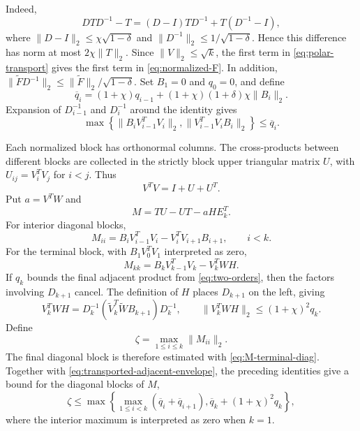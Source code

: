 \documentclass[11pt]{article}
\theoremstyle{definition}
\begin{document}
Indeed,
\[
 DTD^{-1}-T=(D-I)TD^{-1}+T(D^{-1}-I),
\]
where $\|D-I\|_2\le\chi\sqrt{1-\delta}$ and
$\|D^{-1}\|_2\le1/\sqrt{1-\delta}$.  Hence this difference has norm at most
$2\chi\|T\|_2$.  Since $\|V\|_2\le\sqrt{k}$, the first term in
\eqref{eq:polar-transport} gives the first term in
\eqref{eq:normalized-F}.  In addition,
$\|\widetilde FD^{-1}\|_2\le\|\widetilde F\|_2/\sqrt{1-\delta}$.
Set $B_1=0$ and $q_0=0$, and define
\begin{equation}
 \overline q_i=(1+\chi)q_{i-1}
 +(1+\chi)(1+\delta)\chi\|B_i\|_2.
 \label{eq:transported-adjacent-envelope}
\end{equation}
Expansion of $D_{i-1}^{-1}$ and $D_i^{-1}$ around the identity gives
\begin{equation}
 \max\left\{
 \|B_iV_{i-1}^TV_i\|_2,
 \|V_{i-1}^TV_iB_i\|_2
 \right\}\le\overline q_i.
 \label{eq:transported-adjacent-bound}
\end{equation}

Each normalized block has orthonormal columns.  The cross-products between
different blocks are collected in the strictly block upper triangular
matrix $U$, with $U_{ij}=V_i^TV_j$ for $i<j$.  Thus
\begin{equation}
 V^TV=I+U+U^T.
 \label{eq:U-def}
\end{equation}
Put $a=V^TW$ and
\begin{equation}
 M=TU-UT-aHE_k^T.
 \label{eq:M-def}
\end{equation}
For interior diagonal blocks,
\begin{equation}
 M_{ii}=B_iV_{i-1}^TV_i-V_i^TV_{i+1}B_{i+1},
 \qquad i<k.
 \label{eq:M-diag}
\end{equation}
For the terminal block, with $B_1V_0^TV_1$ interpreted as zero,
\begin{equation}
 M_{kk}=B_kV_{k-1}^TV_k-V_k^TWH.
 \label{eq:M-terminal-diag}
\end{equation}
If $q_k$ bounds the final adjacent product from
\eqref{eq:two-orders}, then the factors involving $D_{k+1}$ cancel.  The
definition of $H$ places $D_{k+1}$ on the left, giving
\begin{equation}
 V_k^TWH
 =D_k^{-1}(\widetilde V_k^T\widetilde W B_{k+1})D_k^{-1},
 \qquad
 \|V_k^TWH\|_2\le(1+\chi)^2q_k.
 \label{eq:terminal-bound}
\end{equation}
Define
\begin{equation}
 \zeta=\max_{1\le i\le k}\|M_{ii}\|_2.
 \label{eq:zeta-definition}
\end{equation}
The final diagonal block is therefore estimated with
\eqref{eq:M-terminal-diag}.  Together with
\eqref{eq:transported-adjacent-envelope}, the preceding identities give a
bound for the diagonal blocks of $M$,
\begin{equation}
 \zeta\le
 \max\left\{
  \max_{1\le i<k}(\overline q_i+\overline q_{i+1}),
  \overline q_k+(1+\chi)^2q_k
 \right\},
 \label{eq:zeta-bound}
\end{equation}
where the interior maximum is interpreted as zero when $k=1$.
\end{document}
